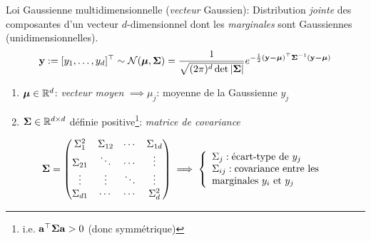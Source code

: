 \documentclass[xcolor=svgnames, t]{beamer}
\newcommand{\vectorx}[1]{\boldsymbol{\MakeLowercase{\mathbf{#1}}}}
\newcommand{\matrixx}[1]{\boldsymbol{\MakeUppercase{#1}}}
\newcommand{\coloredemph}[1]{\textcolor{internationalblue}{\emph{#1}}}
\begin{document}
\begin{frame}{\subsecname}
  

  Loi Gaussienne multidimensionnelle (\coloredemph{vecteur} Gaussien): Distribution \coloredemph{jointe} des composantes d'un vecteur $d$-dimensionnel dont les \coloredemph{marginales} sont Gaussiennes (unidimensionnelles).
  \begin{equation*}
    \vectorx{Y} := [ y_1, \dots, y_d ]^\top  \sim \mathcal{N}(\vectorx{\mu} , \matrixx{\Sigma}) =  \frac{1}{\sqrt{(2 \pi)^d \det |\matrixx{\Sigma}|}} e^{-\frac{1}{2}(\vectorx{y - \mu})^\top \matrixx{\Sigma}^{-1} (\vectorx{y - \mu})}
  \end{equation*}
% 
  \begin{enumerate}
    \item $\vectorx{\mu} \in \mathbb{R}^d$: \coloredemph{vecteur moyen} $\implies \mu_j$: moyenne de la Gaussienne $y_j$
    \item $\matrixx{\Sigma} \in \mathbb{R}^{d \times d}$ définie positive\footnote{i.e. $\vectorx{a}^\top \matrixx{\Sigma} \vectorx{a} > 0$ (donc symmétrique)}: \coloredemph{matrice de covariance}
  \end{enumerate}
% 
  \pause
  \begin{equation*}
    \matrixx{\Sigma}
    =
    \begin{pmatrix} 
      \Sigma^2_{1}  & \Sigma_{{1}{2}} &  \cdots & \Sigma_{{1}{d}} \\
      \Sigma_{{2}{1}} & \ddots          & \cdots  & \vdots \\
      \vdots          & \vdots          & \ddots  & \vdots \\
      \Sigma_{{d}{1}} & \cdots          & \cdots  &  \Sigma^2_{d} 
      \end{pmatrix}
    \implies
    \left\{
      \begin{array}{ll}
        \Sigma_j  : \text{écart-type} \text{ de } y_j\\
        \Sigma_{ij} : \text{covariance entre les } \\
        \text{marginales } y_i \text{ et } y_j
      \end{array}
    \right.
  \end{equation*}
\end{frame}
\end{document}
